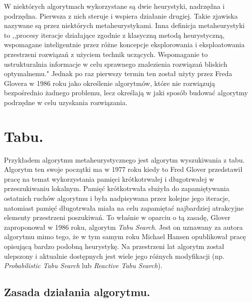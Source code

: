 W niektórych algorytmach wykorzystane są dwie heurystyki, nadrzędna i podrzędna. Pierwsza z nich steruje i wspiera działanie drugiej. Takie zjawiska nazywane są przez niektórych metaheurystykami. \cite{Algorytmy:Widuch} Inna definicja metaheurystyki to ,,procesy iteracje działające zgodnie z klasyczną metodą heurystyczną, wspomagane inteligentnie przez różne koncepcje eksplorowania i eksploatowania przestrzeni rozwiązań z użyciem technik uczących. Wspomaganie to ustrukturalnia informacje w celu sprawnego znalezienia rozwiązań bliskich optymalnemu." \cite{Metaheurystyki:Osman} Jednak po raz pierwszy termin ten został użyty przez Freda Glovera w 1986 roku jako określenie algorytmów, które nie rozwiązują bezpośrednio żadnego problemu, lecz określają w jaki sposób budować algorytmy podrzędne w celu uzyskania rozwiązania. \cite{Future:Glover}

\section{Tabu.}

Przykładem algorytmu metaheurystycznego jest algorytm wyszukiwania z tabu. Algorytm ten swoje początki ma w 1977 roku kiedy to Fred Glover przedstawił pracę na temat wykorzystania pamięci krótkotrwałej i długotrwałej w przeszukiwaniu lokalnym. Pamięć krótkotrwała służyła do zapamiętywania ostatnich ruchów algorytmu i była nadpisywana przez kolejne jego iteracje, natomiast pamięć długotrwała miała na celu zapamiętać najbardziej atrakcyjne elementy przestrzeni poszukiwań. To właśnie w oparciu o tą zasadę, Glover zaproponował w 1986 roku, algorytm \textit{Tabu Search}. Jest on uznawany za autora algorytmu mimo tego, że w tym samym roku Michael Hansen opublikował pracę opisującą bardzo podobną heurystykę. Na przestrzeni lat algorytm został ulepszony i aktualnie dostępnych jest wiele jego różnych modyfikacji (np. \textit{Probabilistic Tabu Search} lub \textit{Reactive Tabu Search}).

\subsection{Zasada działania algorytmu.}


